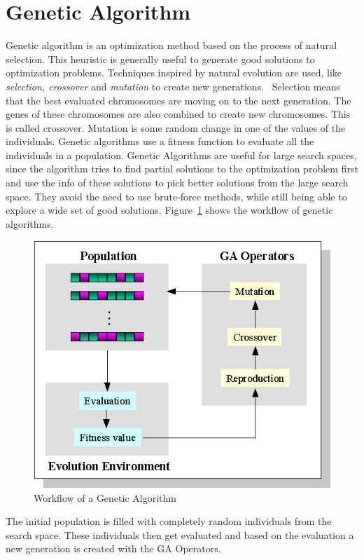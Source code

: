 \documentclass{report}
\begin{document}
\section{Genetic Algorithm}
Genetic algorithm is an optimization method based on the process of natural selection. This heuristic is generally useful to generate good solutions to optimization problems. Techniques inspired by natural evolution are used, like \textit{selection, crossover} and \textit{mutation} to create new generations.~\cite{mitchell1998introduction} Selection means that the best evaluated chromosomes are moving on to the next generation. The genes of these chromosomes are also combined to create new chromosomes. This is called crossover. Mutation is some random change in one of the values of the individuals. Genetic algorithms use a fitness function to evaluate all the individuals in a population. Genetic Algorithms are useful for large search spaces, since the algorithm tries to find partial solutions to the optimization problem first and use the info of these solutions to pick better solutions from the large search space. They avoid the need to use brute-force methods, while still being able to explore a wide set of good solutions. Figure~\ref{fig:gaworkflow} shows the workflow of genetic algorithms.

\begin{figure}[ht]
	\centering
	\includegraphics[width=0.7\linewidth]{imgs/gaworkflow.png}
	\caption{Workflow of a Genetic Algorithm}
	\label{fig:gaworkflow}
\end{figure}

The initial population is filled with completely random individuals from the search space. These individuals then get evaluated and based on the evaluation a new generation is created with the GA Operators.
\end{document}
